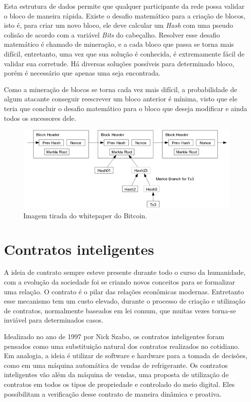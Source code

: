 \documentclass{ufsctex/ufsctex}
\begin{document}
Esta estrutura de dados permite que qualquer participante da rede possa validar
o bloco de maneira rápida. Existe o desafio matemático para a criação de blocos,
isto é, para criar um novo bloco, ele deve calcular um \textit{Hash} com uma
pseudo colisão de acordo com a variável \textit{Bits} do cabeçalho. Resolver
esse desafio matemático é chamado de mineração, e a cada bloco que passa se
torna mais difícil, entretanto, uma vez que sua solução é conhecida, é
extremamente fácil de validar sua corretude. Há diversas soluções possíveis para
determinado bloco, porém é necessário que apenas uma seja
encontrada.\cite{Antonopoulos}

Como a mineração de blocos se torna cada vez mais difícil, a probabilidade de
algum atacante conseguir reescrever um bloco anterior é mínima, visto que ele
teria que concluir o desafio matemático para o bloco que deseja modificar e
ainda todos os sucessores dele.

\begin{figure}[h]
	\centering
	\includegraphics[scale=0.4]{blockchain}
	\caption{Imagem tirada do whitepaper do Bitcoin.}
	\label{fig:blockchain}
\end{figure}

\section{Contratos inteligentes} A ideia de contrato sempre esteve presente
durante todo o curso da humanidade, com a evolução da sociedade foi se criando
novos conceitos para se formalizar uma relação. O contrato é o pilar das
relações econômicas modernas. Entretanto esse mecanismo tem um custo elevado,
durante o processo de criação e utilização de contratos, normalmente baseados em
lei comum, que muitas vezes torna-se inviável para determinados casos.

Idealizado no ano de 1997 por Nick Szabo, os contratos inteligentes foram
pensados como uma substituição natural dos contratos realizados no cotidiano.
Em analogia, a ideia é utilizar de software e hardware para a tomada de
decisões, como em uma máquina automática de vendas de refrigerante. Os
contratos inteligentes vão além da máquina de vendas, uma proposta de
utilização de contratos em todos os tipos de propriedade e controlado do meio
digital. Eles possibilitam a verificação desse contrato de maneira dinâmica e
proativa.\cite{szabo-smart}
\end{document}
